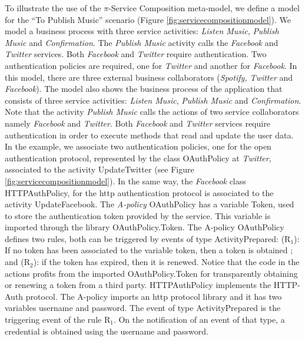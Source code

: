 \documentclass{singlecol-new}
\theoremstyle{TH}{
\newtheorem{lemma}{Lemma}
\newtheorem{theorem}[lemma]{Theorem}
\newtheorem{corrolary}[lemma]{Corrolary}
\newtheorem{conjecture}[lemma]{Conjecture}
\newtheorem{proposition}[lemma]{Proposition}
\newtheorem{claim}[lemma]{Claim}
\newtheorem{stheorem}[lemma]{Wrong Theorem}
\newtheorem{algorithm}{Algorithm}
}
\theoremstyle{THrm}{
\newtheorem{definition}{Definition}[section]
\newtheorem{question}{Question}[section]
\newtheorem{remark}{Remark}
\newtheorem{scheme}{Scheme}
}
\theoremstyle{THhit}{
\newtheorem{case}{Case}[section]
}
\theoremstyle{THhsl}{
\newtheorem{example}{Example}
}
\begin{document}
\begin{example}\label{ex:toPublicMusic4}
To illustrate the use of the $\pi$-Service Composition meta-model, we define a model for the ``To Publish Music'' scenario (Figure \ref{fig:servicecompositionmodel}).
 We model a business process with three service activities: {\em Listen Music}, {\em Publish Music} and {\em Confirmation}.
The {\em Publish Music} activity calls the {\em Facebook} and {\em Twitter} services.
Both {\em Facebook} and {\em Twitter} require authentication.
Two authentication policies are required, one for {\em Twitter} and another for {\em Facebook}.
In this model, there are three external business collaborators ({\em Spotify, Twitter} and {\em Facebook}).
The model also shows the business process of the application that consists of three service activities: {\em Listen Music}, {\em Publish Music} and {\em Confirmation}.
Note that  the activity {\em Publish Music} calls the actions of two service collaborators namely {\em Facebook} and {\em Twitter}.
Both {\em Facebook} and {\em Twitter} services require authentication in order to execute methods that read and update the user data.
In the example, we  associate two authentication policies, one for the open authentication protocol, represented by the class {\sf\small OAuthPolicy} at {\em Twitter}, associated to the activity  {\sf\small UpdateTwitter} (see Figure \ref{fig:servicecompositionmodel}).
In the same way, the {\em Facebook} class {\sf\small HTTPAuthPolicy}, for the http authentication protocol is associated to the activity {\sf\small UpdateFacebook}.
The {\em A-policy} {\sf\small OAuthPolicy} has a variable {\sf\small Token}, used to store the authentication token provided by the service.
This variable is imported through the library {\sf\small OAuthPolicy.Token}.
The A-policy {\sf\small OAuthPolicy} defines two rules, both can be triggered by events of type {\sf\small ActivityPrepared}: ({\sf\small R$_1$}): If no token has been associated to the variable {\sf\small token}, then a token is obtained ; and ({\sf\small R$_2$}): if the token has expired, then it is renewed.
Notice that the code in the actions profits from the imported {\sf\small OAuthPolicy.Token} for transparently obtaining or renewing a token from a third party.
{\sf\small HTTPAuthPolicy} implements the HTTP-Auth protocol.
The A-policy imports an http protocol library and it has two variables {\sf\small username} and {\sf\small password}.
The event of type {\sf\small ActivityPrepared} is the triggering event of the rule {\sf\small R$_1$}.
On the notification of an event of that type, a credential is obtained using the username and password.
\end{example}
\end{document}
